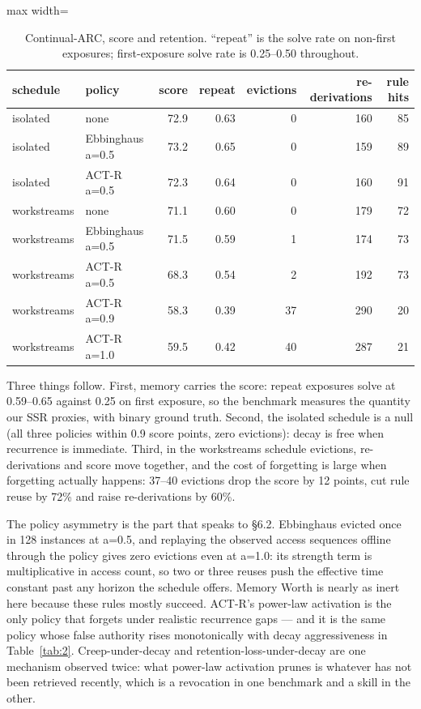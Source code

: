 \begin{table}[t]
\centering
\footnotesize
\caption{Continual-ARC, score and retention. ``repeat'' is the solve rate on non-first exposures; first-exposure solve rate is 0.25--0.50 throughout.}
\label{tab:6}
\begin{adjustbox}{max width=\linewidth}
\begin{tabular}{llrrrrr}
\toprule
schedule & policy & score & repeat & evictions & re-derivations & rule hits \\
\midrule
isolated & none & 72.9 & 0.63 & 0 & 160 & 85 \\
isolated & Ebbinghaus a=0.5 & 73.2 & 0.65 & 0 & 159 & 89 \\
isolated & ACT-R a=0.5 & 72.3 & 0.64 & 0 & 160 & 91 \\
workstreams & none & 71.1 & 0.60 & 0 & 179 & 72 \\
workstreams & Ebbinghaus a=0.5 & 71.5 & 0.59 & 1 & 174 & 73 \\
workstreams & ACT-R a=0.5 & 68.3 & 0.54 & 2 & 192 & 73 \\
workstreams & ACT-R a=0.9 & 58.3 & 0.39 & 37 & 290 & 20 \\
workstreams & ACT-R a=1.0 & 59.5 & 0.42 & 40 & 287 & 21 \\
\bottomrule
\end{tabular}
\end{adjustbox}
\end{table}

Three things follow. First, memory carries the score: repeat exposures solve at 0.59--0.65 against 0.25 on first exposure, so the benchmark measures the quantity our SSR proxies, with binary ground truth. Second, the isolated schedule is a null (all three policies within 0.9 score points, zero evictions): decay is free when recurrence is immediate. Third, in the workstreams schedule evictions, re-derivations and score move together, and the cost of forgetting is large when forgetting actually happens: 37--40 evictions drop the score by 12 points, cut rule reuse by 72\% and raise re-derivations by 60\%.

The policy asymmetry is the part that speaks to \S6.2. Ebbinghaus evicted once in 128 instances at a=0.5, and replaying the observed access sequences offline through the policy gives zero evictions even at a=1.0: its strength term is multiplicative in access count, so two or three reuses push the effective time constant past any horizon the schedule offers. Memory Worth is nearly as inert here because these rules mostly succeed. ACT-R's power-law activation is the only policy that forgets under realistic recurrence gaps --- and it is the same policy whose false authority rises monotonically with decay aggressiveness in Table~\ref{tab:2}. Creep-under-decay and retention-loss-under-decay are one mechanism observed twice: what power-law activation prunes is whatever has not been retrieved recently, which is a revocation in one benchmark and a skill in the other.

